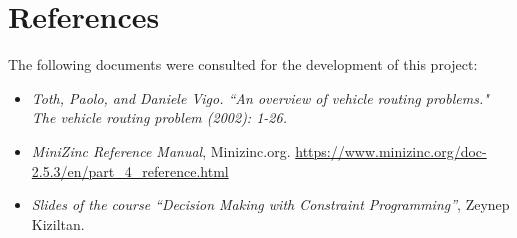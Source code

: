 \documentclass[main.tex]{subfiles}
\begin{document}
\section{References}
\label{sec:references}

The following documents were consulted for the development of this project:
\begin{itemize}
    \item \textit{Toth, Paolo, and Daniele Vigo. ``An overview of vehicle routing problems." The vehicle routing problem (2002): 1-26.}
    \item \textit{MiniZinc Reference Manual}, Minizinc.org. \href{https://www.minizinc.org/doc-2.5.3/en/part_4_reference.html}{https://www.minizinc.org/doc-2.5.3/en/part\_4\_reference.html}
    \item \textit{Slides of the course ``Decision Making with Constraint Programming''}, Zeynep Kiziltan.
\end{itemize}
\end{document}
